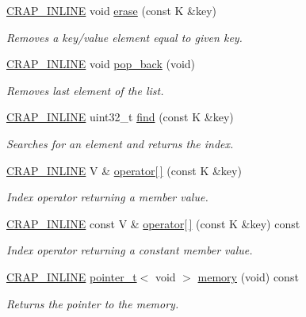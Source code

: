 \begin{DoxyCompactItemize}
\hyperlink{config__x86_8h_a5a40526b8d842e7ff731509998bb0f1c}{C\+R\+A\+P\+\_\+\+I\+N\+L\+I\+N\+E} void \hyperlink{classcrap_1_1array__map_a9c487b6b712e6951068294f9566b4c77}{erase} (const K \&key)
\begin{DoxyCompactList}\small\item\em Removes a key/value element equal to given key. \end{DoxyCompactList}\item 
\hyperlink{config__x86_8h_a5a40526b8d842e7ff731509998bb0f1c}{C\+R\+A\+P\+\_\+\+I\+N\+L\+I\+N\+E} void \hyperlink{classcrap_1_1array__map_ad3200915686e26e3e6ae5573e1c24f19}{pop\+\_\+back} (void)
\begin{DoxyCompactList}\small\item\em Removes last element of the list. \end{DoxyCompactList}\item 
\hyperlink{config__x86_8h_a5a40526b8d842e7ff731509998bb0f1c}{C\+R\+A\+P\+\_\+\+I\+N\+L\+I\+N\+E} uint32\+\_\+t \hyperlink{classcrap_1_1array__map_a508782d23a95e5da6faf3345960ebe55}{find} (const K \&key)
\begin{DoxyCompactList}\small\item\em Searches for an element and returns the index. \end{DoxyCompactList}\item 
\hyperlink{config__x86_8h_a5a40526b8d842e7ff731509998bb0f1c}{C\+R\+A\+P\+\_\+\+I\+N\+L\+I\+N\+E} V \& \hyperlink{classcrap_1_1array__map_a697a101ecc2d4349862165851f82adaf}{operator\mbox{[}$\,$\mbox{]}} (const K \&key)
\begin{DoxyCompactList}\small\item\em Index operator returning a member value. \end{DoxyCompactList}\item 
\hyperlink{config__x86_8h_a5a40526b8d842e7ff731509998bb0f1c}{C\+R\+A\+P\+\_\+\+I\+N\+L\+I\+N\+E} const V \& \hyperlink{classcrap_1_1array__map_a54bc335e6ab4b13e7c17d4d889ee6433}{operator\mbox{[}$\,$\mbox{]}} (const K \&key) const 
\begin{DoxyCompactList}\small\item\em Index operator returning a constant member value. \end{DoxyCompactList}\item 
\hyperlink{config__x86_8h_a5a40526b8d842e7ff731509998bb0f1c}{C\+R\+A\+P\+\_\+\+I\+N\+L\+I\+N\+E} \hyperlink{structcrap_1_1pointer__t}{pointer\+\_\+t}$<$ void $>$ \hyperlink{classcrap_1_1array__map_a7a498ac2d6aadc5c9ecdf71e2c142072}{memory} (void) const 
\begin{DoxyCompactList}\small\item\em Returns the pointer to the memory. \end{DoxyCompactList}\end{DoxyCompactItemize}
